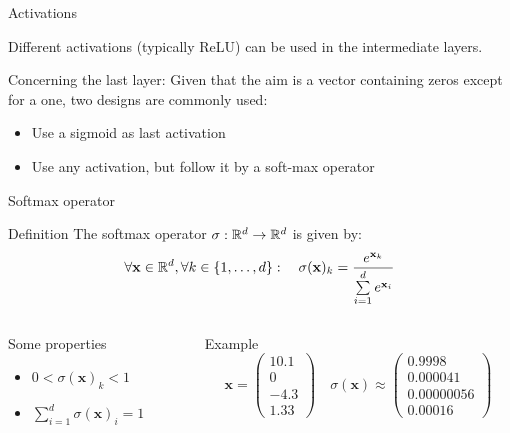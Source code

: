 \documentclass[handout,xcolor=pdftex,dvipsnames,table,mathserif]{beamer}
\newcommand{\myvec}[1]{\ensuremath{\begin{pmatrix}#1\end{pmatrix}}}
\begin{document}
\begin{frame}{Activations}

  Different activations (typically ReLU) can be used in the intermediate layers.
  \vspace{1em}

  Concerning the last layer: Given that the aim is a vector containing zeros except for a one, two designs are commonly used:

  \begin{itemize}
  \item Use a sigmoid as last activation
  \item Use any activation, but follow it by a soft-max operator
  \end{itemize}

\end{frame}

\begin{frame}{Softmax operator}

  \begin{block}{Definition}
    The softmax operator $\sigma: \mathbb{R}^d \rightarrow \mathbb{R}^d$ is given by:
    \[
    \forall \mathbf{x}  \in \mathbb{R}^d, \forall k \in \{1, \ldots, d\}:\quad \sigma(\mathbf{x})_k = \frac{e^{\mathbf{x}_k}}{\sum\limits_{i=1}^d e^{\mathbf{x}_i}}
    \]
  \end{block}

  \pause

  \begin{columns}
    \begin{column}{.3\textwidth}
      \begin{block}{Some properties}
        \begin{itemize}
        \item $0 < \sigma(\mathbf{x})_k < 1$
        \item $\sum\limits_{i=1}^d \sigma(\mathbf{x})_i = 1$
        \end{itemize}
      \end{block}

    \end{column}

    \pause

    \begin{column}{.7\textwidth}

      \begin{block}{Example}
        \[
        \mathbf{x} = \myvec{10.1\\0\\-4.3\\1.33}  \quad \sigma(\mathbf{x}) \approx \myvec{0.9998\\0.000041\\0.00000056\\0.00016}
        \]

      \end{block}



    \end{column}
  \end{columns}



\end{frame}
\end{document}
